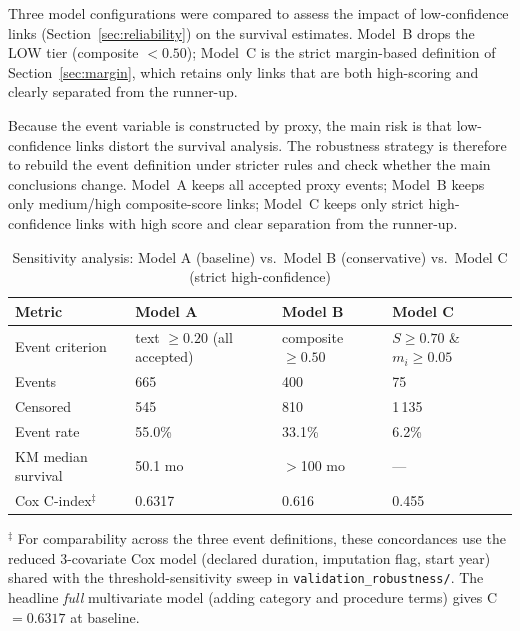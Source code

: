 \documentclass[12pt, a4paper]{article}
\begin{document}
Three model configurations were compared to assess the impact of low-confidence
links (Section~\ref{sec:reliability}) on the survival estimates. Model~B drops
the LOW tier (composite $< 0.50$); Model~C is the strict margin-based definition
of Section~\ref{sec:margin}, which retains only links that are both high-scoring
and clearly separated from the runner-up.

Because the event variable is constructed by proxy, the main risk is that
low-confidence links distort the survival analysis. The robustness strategy is
therefore to rebuild the event definition under stricter rules and check
whether the main conclusions change. Model~A keeps all accepted proxy events;
Model~B keeps only medium/high composite-score links; Model~C keeps only strict
high-confidence links with high score and clear separation from the runner-up.

\begin{table}[H]
\centering
\caption{Sensitivity analysis: Model A (baseline) vs.\ Model B (conservative)
vs.\ Model C (strict high-confidence)}
\label{tab:sensitivity}
\begin{tabular}{@{}P{5.5cm}R{2.0cm}R{2.0cm}R{2.2cm}@{}}
\toprule
Metric & Model A & Model B & Model C \\
\midrule
Event criterion & text $\geq 0.20$ (all accepted) & composite $\geq 0.50$ & $S \geq 0.70$ \& $m_i \geq 0.05$ \\
Events & 665 & 400 & 75 \\
Censored & 545 & 810 & 1\,135 \\
Event rate & 55.0\% & 33.1\% & 6.2\% \\
KM median survival & 50.1 mo & $>$100 mo & --- \\
Cox C-index$^\ddagger$ & 0.6317 & 0.616 & 0.455 \\
\bottomrule
\end{tabular}

\smallskip
{\footnotesize $^\ddagger$ For comparability across the three event definitions,
these concordances use the reduced 3-covariate Cox model (declared duration,
imputation flag, start year) shared with the threshold-sensitivity sweep in
\texttt{validation\_robustness/}. The headline \emph{full} multivariate model
(adding category and procedure terms) gives C~$=0.6317$ at baseline.}
\end{table}
\end{document}
